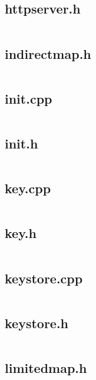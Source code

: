 \documentclass{article}
\begin{document}
\subsection{httpserver.h}
\inputminted{cpp}{/home/dufferzafar/dev/@clones/bitcoin/src/httpserver.h}
\newpage

\subsection{indirectmap.h}
\inputminted{cpp}{/home/dufferzafar/dev/@clones/bitcoin/src/indirectmap.h}
\newpage

\subsection{init.cpp}
\inputminted{cpp}{/home/dufferzafar/dev/@clones/bitcoin/src/init.cpp}
\newpage

\subsection{init.h}
\inputminted{cpp}{/home/dufferzafar/dev/@clones/bitcoin/src/init.h}
\newpage

\subsection{key.cpp}
\inputminted{cpp}{/home/dufferzafar/dev/@clones/bitcoin/src/key.cpp}
\newpage

\subsection{key.h}
\inputminted{cpp}{/home/dufferzafar/dev/@clones/bitcoin/src/key.h}
\newpage

\subsection{keystore.cpp}
\inputminted{cpp}{/home/dufferzafar/dev/@clones/bitcoin/src/keystore.cpp}
\newpage

\subsection{keystore.h}
\inputminted{cpp}{/home/dufferzafar/dev/@clones/bitcoin/src/keystore.h}
\newpage

\subsection{limitedmap.h}
\inputminted{cpp}{/home/dufferzafar/dev/@clones/bitcoin/src/limitedmap.h}
\newpage
\end{document}
